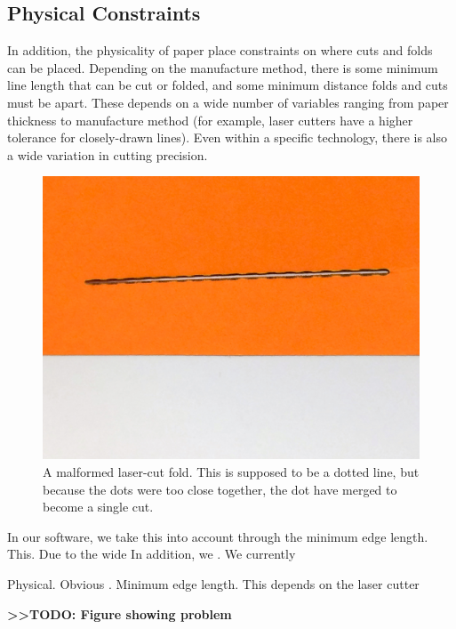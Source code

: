 \subsection{Physical Constraints}\label{physical-constraints}

In addition, the physicality of paper place constraints on where cuts
and folds can be placed. Depending on the manufacture method, there is
some minimum line length that can be cut or folded, and some minimum
distance folds and cuts must be apart. These depends on a wide number of
variables ranging from paper thickness to manufacture method (for
example, laser cutters have a higher tolerance for closely-drawn lines).
Even within a specific technology, there is also a wide variation in
cutting precision.

\begin{figure}[htbp]
\centering
\includegraphics{figures/45_Tech_Constraints/tooclosecuts.jpg}
\caption{A malformed laser-cut fold. This is supposed to be a dotted
line, but because the dots were too close together, the dot have merged
to become a single cut.}
\end{figure}

In our software, we take this into account through the minimum edge
length. This. Due to the wide In addition, we . We currently

Physical. Obvious . Minimum edge length. This depends on the laser
cutter

\textbf{\textgreater{}\textgreater{}TODO: Figure showing problem}
